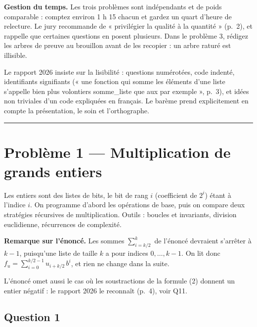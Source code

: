 \documentclass[11pt,a4paper]{article}
\begin{document}
\textbf{Gestion du temps.} Les trois problèmes sont indépendants et de poids comparable : comptez environ 1 h 15 chacun et gardez un quart d'heure de relecture. Le jury recommande de « privilégier la qualité à la quantité » (p.~2), et rappelle que certaines questions en posent plusieurs. Dans le problème 3, rédigez les arbres de preuve au brouillon avant de les recopier : un arbre raturé est illisible.

\begin{jury}

Le rapport 2026 insiste sur la lisibilité : questions numérotées, code indenté, identifiants signifiants (« une fonction qui somme les éléments d'une liste s'appelle bien plus volontiers somme\_liste que aux par exemple », p.~3), et idées non triviales d'un code expliquées en français. Le barème prend explicitement en compte la présentation, le soin et l'orthographe.

\end{jury}

\begin{center}\rule{0.5\linewidth}{0.5pt}\end{center}

\hypertarget{probluxe8me-1-multiplication-de-grands-entiers}{%
\section{Problème 1 --- Multiplication de grands entiers}\label{probluxe8me-1-multiplication-de-grands-entiers}}

Les entiers sont des listes de bits, le bit de rang \(i\) (coefficient de \(2^i\)) étant à l'indice \(i\). On programme d'abord les opérations de base, puis on compare deux stratégies récursives de multiplication. Outils : boucles et invariants, division euclidienne, récurrences de complexité.

\textbf{Remarque sur l'énoncé.} Les sommes \(\sum_{i=k/2}^{k}\) de l'énoncé devraient s'arrêter à \(k-1\), puisqu'une liste de taille \(k\) a pour indices \(0, \dots, k-1\). On lit donc \(f_u = \sum_{i=0}^{k/2-1} u_{i+k/2}\,b^i\), et rien ne change dans la suite.

L'énoncé omet aussi le cas où les soustractions de la formule (2) donnent un entier négatif : le rapport 2026 le reconnaît (p.~4), voir Q11.

\hypertarget{question-1}{%
\subsection{Question 1}\label{question-1}}
\end{document}
